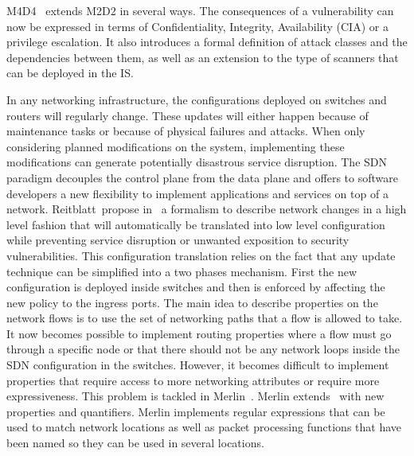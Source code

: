 M4D4~\cite{M4D4-Morin2008} extends M2D2 in several ways. The consequences of a vulnerability can now be expressed in terms of Confidentiality, Integrity, Availability (CIA) or a privilege escalation.
It also introduces a formal definition of attack classes and the dependencies between them, as well as an extension to the type of scanners that can be deployed in the IS.

In any networking infrastructure, the configurations deployed on switches and routers will regularly change. These updates will either happen because of maintenance tasks or because of physical failures and attacks.
When only considering planned modifications on the system, implementing these modifications can generate potentially disastrous service disruption.
The SDN paradigm decouples the control plane from the data plane and offers to software developers a new flexibility to implement applications and services on top of a network.
Reitblatt~\etal propose in~\cite{abstraction-reitblatt2012} a formalism to describe network changes in a high level fashion that will automatically be translated into low level configuration while preventing service disruption or unwanted exposition to security vulnerabilities.
This configuration translation relies on the fact that any update technique can be simplified into a two phases mechanism. First the new configuration is deployed inside switches and then is enforced by affecting the new policy to the ingress ports.
The main idea to describe properties on the network flows is to use the set of networking paths that a flow is allowed to take.
It now becomes possible to implement routing properties where a flow must go through a specific node or that there should not be any network loops inside the SDN configuration in the switches.
However, it becomes difficult to implement properties that require access to more networking attributes or require more expressiveness. This problem is tackled in Merlin~\cite{Merlin-Soule2013}.
Merlin extends~\cite{abstraction-reitblatt2012} with new properties and quantifiers.
Merlin implements regular expressions that can be used to match network locations as well as packet processing functions that have been named so they can be used in several locations.


